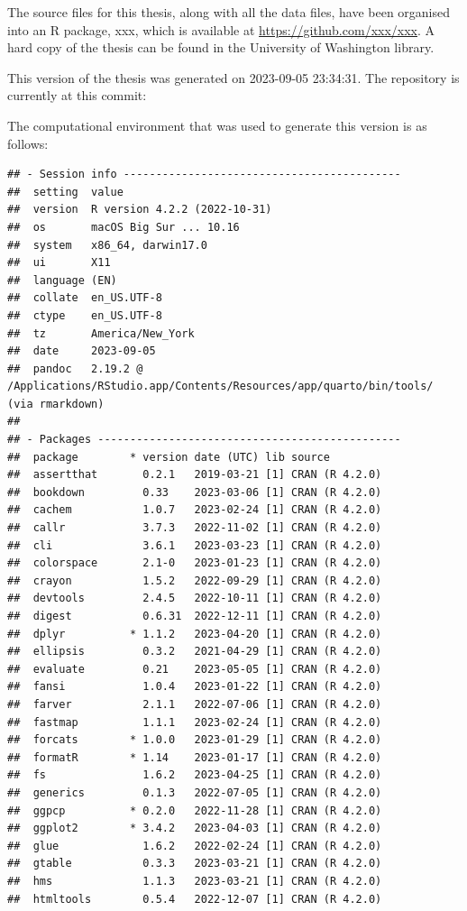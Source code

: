 \documentclass[print]{nuthesis}
\begin{document}
The source files for this thesis, along with all the data files, have been organised into an R package, xxx, which is available at \url{https://github.com/xxx/xxx}. A hard copy of the thesis can be found in the University of Washington library.

This version of the thesis was generated on 2023-09-05 23:34:31. The repository is currently at this commit:

The computational environment that was used to generate this version is as follows:

\begin{verbatim}
## - Session info -------------------------------------------
##  setting  value
##  version  R version 4.2.2 (2022-10-31)
##  os       macOS Big Sur ... 10.16
##  system   x86_64, darwin17.0
##  ui       X11
##  language (EN)
##  collate  en_US.UTF-8
##  ctype    en_US.UTF-8
##  tz       America/New_York
##  date     2023-09-05
##  pandoc   2.19.2 @ /Applications/RStudio.app/Contents/Resources/app/quarto/bin/tools/ (via rmarkdown)
## 
## - Packages -----------------------------------------------
##  package        * version date (UTC) lib source
##  assertthat       0.2.1   2019-03-21 [1] CRAN (R 4.2.0)
##  bookdown         0.33    2023-03-06 [1] CRAN (R 4.2.0)
##  cachem           1.0.7   2023-02-24 [1] CRAN (R 4.2.0)
##  callr            3.7.3   2022-11-02 [1] CRAN (R 4.2.0)
##  cli              3.6.1   2023-03-23 [1] CRAN (R 4.2.0)
##  colorspace       2.1-0   2023-01-23 [1] CRAN (R 4.2.0)
##  crayon           1.5.2   2022-09-29 [1] CRAN (R 4.2.0)
##  devtools         2.4.5   2022-10-11 [1] CRAN (R 4.2.0)
##  digest           0.6.31  2022-12-11 [1] CRAN (R 4.2.0)
##  dplyr          * 1.1.2   2023-04-20 [1] CRAN (R 4.2.0)
##  ellipsis         0.3.2   2021-04-29 [1] CRAN (R 4.2.0)
##  evaluate         0.21    2023-05-05 [1] CRAN (R 4.2.0)
##  fansi            1.0.4   2023-01-22 [1] CRAN (R 4.2.0)
##  farver           2.1.1   2022-07-06 [1] CRAN (R 4.2.0)
##  fastmap          1.1.1   2023-02-24 [1] CRAN (R 4.2.0)
##  forcats        * 1.0.0   2023-01-29 [1] CRAN (R 4.2.0)
##  formatR        * 1.14    2023-01-17 [1] CRAN (R 4.2.0)
##  fs               1.6.2   2023-04-25 [1] CRAN (R 4.2.0)
##  generics         0.1.3   2022-07-05 [1] CRAN (R 4.2.0)
##  ggpcp          * 0.2.0   2022-11-28 [1] CRAN (R 4.2.0)
##  ggplot2        * 3.4.2   2023-04-03 [1] CRAN (R 4.2.0)
##  glue             1.6.2   2022-02-24 [1] CRAN (R 4.2.0)
##  gtable           0.3.3   2023-03-21 [1] CRAN (R 4.2.0)
##  hms              1.1.3   2023-03-21 [1] CRAN (R 4.2.0)
##  htmltools        0.5.4   2022-12-07 [1] CRAN (R 4.2.0)

\end{verbatim}
\end{document}
